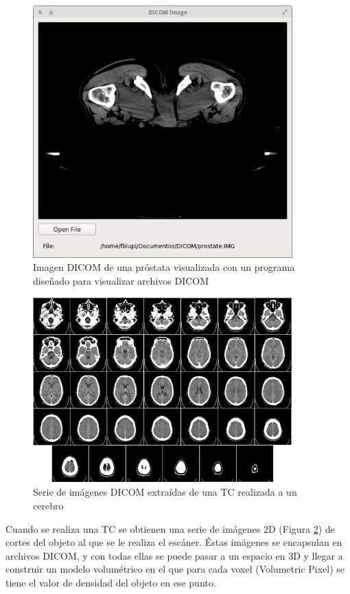 \begin{figure}[H]
	\centering
	\includegraphics[width=10cm]{imagenes/prostate_dicom}
	\caption{Imagen DICOM de una próstata visualizada con un programa diseñado para visualizar archivos DICOM}
	\label{fig:prostate_dicom}
\end{figure}

\begin{figure}[H]
	\centering
	\includegraphics[width=10cm]{imagenes/brain_dicom_serie}
	\caption{Serie de imágenes DICOM extraídas de una TC realizada a un cerebro}
	\label{fig:brain_dicom_serie}
\end{figure}

Cuando se realiza una TC se obtienen una serie de imágenes 2D (Figura \ref{fig:brain_dicom_serie}) de cortes del objeto al que se le realiza el escáner. Éstas imágenes se encapsulan en archivos DICOM, y con todas ellas se puede pasar a un espacio en 3D y llegar a construir un modelo volumétrico en el que para cada voxel (Volumetric Pixel) se tiene el valor de densidad del objeto en ese punto.

